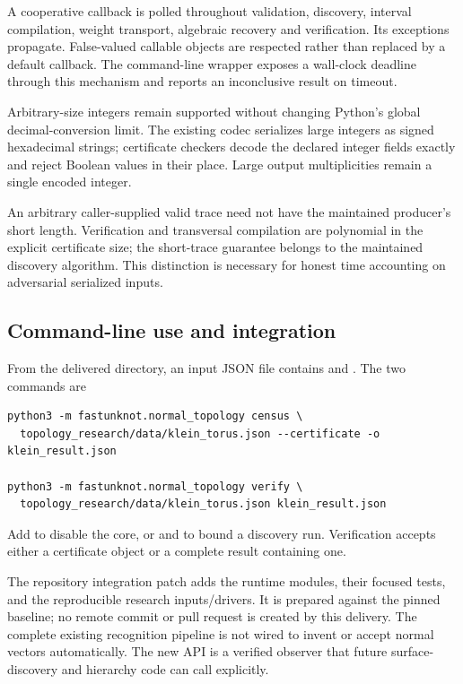 A cooperative  callback is polled throughout validation,
discovery, interval compilation, weight transport, algebraic recovery and
verification. Its exceptions propagate. False-valued callable objects are
respected rather than replaced by a default callback. The command-line
wrapper exposes a wall-clock deadline through this mechanism and reports
an inconclusive result on timeout.

Arbitrary-size integers remain supported without changing Python's global
decimal-conversion limit. The existing  codec serializes
large integers as signed hexadecimal strings; certificate checkers decode
the declared integer fields exactly and reject Boolean values in their
place. Large output multiplicities remain a single encoded integer.

An arbitrary caller-supplied valid trace need not have the maintained
producer's short length. Verification and transversal compilation are
polynomial in the explicit certificate size; the short-trace guarantee
belongs to the maintained discovery algorithm. This distinction is necessary
for honest time accounting on adversarial serialized inputs.

\subsection{Command-line use and integration}

From the delivered  directory, an input JSON file contains
 and . The two commands are
\begin{lstlisting}
python3 -m fastunknot.normal_topology census \
  topology_research/data/klein_torus.json --certificate -o klein_result.json

python3 -m fastunknot.normal_topology verify \
  topology_research/data/klein_torus.json klein_result.json
\end{lstlisting}
Add \code{--direct} to disable the core, or  and
\code{--timeout} to bound a discovery run. Verification accepts either a
certificate object or a complete result containing one.

The repository integration patch adds the runtime modules, their focused
tests, and the reproducible research inputs/drivers. It is prepared against
the pinned baseline; no remote commit or pull request is created by this
delivery. The complete existing recognition pipeline is not wired to invent
or accept normal vectors automatically. The new API is a verified observer
that future surface-discovery and hierarchy code can call explicitly.
